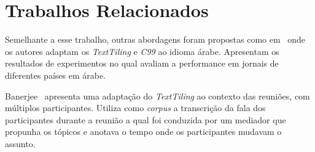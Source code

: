 \section{Trabalhos Relacionados}
	\label{sec:trabalhos}






Semelhante a esse trabalho, outras abordagens foram propostas como em~\cite{CHAIBI2014} onde os autores adaptam os \textit{TextTiling} e \textit{C99} ao idioma árabe. Apresentam os resultados de experimentos no qual avaliam a performance em jornais de diferentes países em árabe. 


Banerjee~\cite{Banerjee2006} apresenta uma adaptação do \textit{TextTiling} ao contexto das reuniões, com múltiplos participantes.           Utiliza como \textit{corpus} a transcrição da fala dos participantes durante a reunião a qual foi conduzida por um mediador que propunha os tópicos e anotava o tempo onde os participantes mudavam o assunto.